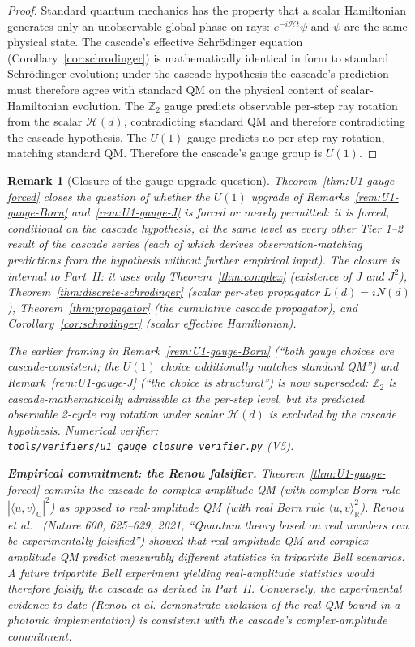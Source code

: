 \documentclass[12pt,a4paper]{article}
\newtheorem{remark}[theorem]{Remark}
\begin{document}
\begin{proof}
Standard quantum mechanics has the property that a scalar Hamiltonian
generates only an unobservable global phase on rays:
$e^{-i\mathcal{H}t}\psi$ and $\psi$ are the same physical state. The
cascade's effective Schr\"odinger equation
(Corollary~\ref{cor:schrodinger}) is mathematically identical in form to
standard Schr\"odinger evolution; under the cascade hypothesis the
cascade's prediction must therefore agree with standard QM on the
physical content of scalar-Hamiltonian evolution. The $\mathbb{Z}_2$
gauge predicts observable per-step ray rotation from the scalar
$\mathcal{H}(d)$, contradicting standard QM and therefore contradicting
the cascade hypothesis. The $U(1)$ gauge predicts no per-step ray
rotation, matching standard QM. Therefore the cascade's gauge group is
$U(1)$.
\end{proof}

\begin{remark}[Closure of the gauge-upgrade question]\label{rem:U1-closure-status}
Theorem~\ref{thm:U1-gauge-forced} closes the question of whether the
$U(1)$ upgrade of Remarks~\ref{rem:U1-gauge-Born} and~\ref{rem:U1-gauge-J}
is forced or merely permitted: it is forced, conditional on the cascade
hypothesis, at the same level as every other Tier 1--2 result of the
cascade series (each of which derives observation-matching predictions
from the hypothesis without further empirical input). The closure is
internal to Part~II: it uses only Theorem~\ref{thm:complex} (existence
of $J$ and $J^2$), Theorem~\ref{thm:discrete-schrodinger} (scalar
per-step propagator $L(d) = iN(d)$), Theorem~\ref{thm:propagator} (the
cumulative cascade propagator), and Corollary~\ref{cor:schrodinger}
(scalar effective Hamiltonian).

The earlier framing in Remark~\ref{rem:U1-gauge-Born} (``both gauge
choices are cascade-consistent; the $U(1)$ choice additionally matches
standard QM'') and Remark~\ref{rem:U1-gauge-J} (``the choice is
structural'') is now superseded: $\mathbb{Z}_2$ is cascade-mathematically
admissible at the per-step level, but its predicted observable 2-cycle
ray rotation under scalar $\mathcal{H}(d)$ is excluded by the cascade
hypothesis. Numerical verifier:
\texttt{tools/verifiers/u1\_gauge\_closure\_verifier.py} (V5).

\medskip
\noindent\textbf{Empirical commitment: the Renou falsifier.}
Theorem~\ref{thm:U1-gauge-forced} commits the cascade to
complex-amplitude QM (with complex Born rule
$|\langle u, v\rangle_\mathbb{C}|^2$) as opposed to real-amplitude QM
(with real Born rule $\langle u, v\rangle_\mathbb{R}^2$). Renou et
al.~\cite{renou2021} (\emph{Nature} 600, 625--629, 2021,
``Quantum theory based on real numbers can be experimentally
falsified'') showed that real-amplitude QM and complex-amplitude QM
predict measurably different statistics in tripartite Bell scenarios.
A future tripartite Bell experiment yielding real-amplitude statistics
would therefore falsify the cascade as derived in Part~II. Conversely,
the experimental evidence to date (Renou \emph{et al.} demonstrate
violation of the real-QM bound in a photonic implementation) is
consistent with the cascade's complex-amplitude commitment.
\end{remark}
\end{document}
